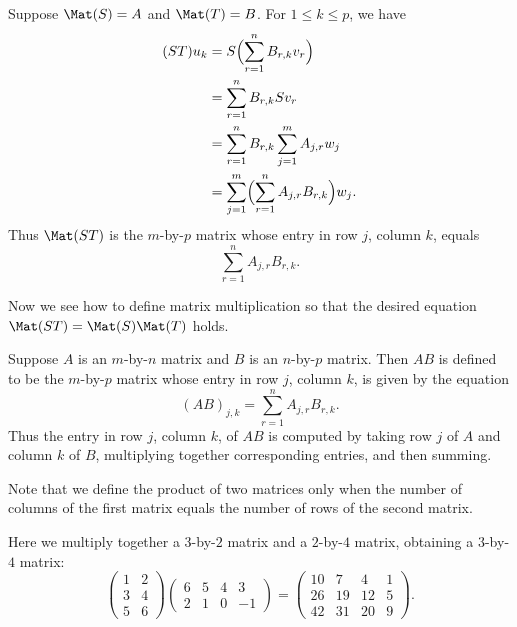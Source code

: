 Suppose $\Mat(S)=A$ and $\Mat(T)=B$. For $1\le k\le p$, we have
\begin{align*}
(ST)u_k &= S\Bigl(\sum_{r=1}^n B_{r,k}v_r\Bigr)\\
        &= \sum_{r=1}^n B_{r,k}Sv_r\\
        &= \sum_{r=1}^n B_{r,k}\sum_{j=1}^m A_{j,r}w_j\\
        &= \sum_{j=1}^m\Bigl(\sum_{r=1}^n A_{j,r}B_{r,k}\Bigr)w_j.
\end{align*}
Thus $\Mat(ST)$ is the $m$-by-$p$ matrix whose entry in row $j$, column $k$,
equals
\[ \sum_{r=1}^n A_{j,r}B_{r,k}. \]

Now we see how to define matrix multiplication so that the desired equation
$\Mat(ST)=\Mat(S)\Mat(T)$ holds.

\begin{definition}\label{ax:3.41}
Suppose $A$ is an $m$-by-$n$ matrix and $B$ is an $n$-by-$p$ matrix. Then $AB$
is defined to be the $m$-by-$p$ matrix whose entry in row $j$, column $k$, is
given by the equation
\[ (AB)_{j,k} = \sum_{r=1}^n A_{j,r}B_{r,k}. \]
Thus the entry in row $j$, column $k$, of $AB$ is computed by taking row $j$ of
$A$ and column $k$ of $B$, multiplying together corresponding entries, and then
summing.
\end{definition}

%
Note that we define the product of two matrices only when the number of columns
of the first matrix equals the number of rows of the second matrix.

\begin{example}\label{ax:3.42}
Here we multiply together a $3$-by-$2$ matrix and a $2$-by-$4$ matrix,
obtaining a $3$-by-$4$ matrix:
\[ \begin{pmatrix} 1 & 2\\ 3 & 4\\ 5 & 6 \end{pmatrix}
   \begin{pmatrix} 6 & 5 & 4 & 3\\ 2 & 1 & 0 & -1 \end{pmatrix}
 = \begin{pmatrix} 10 & 7 & 4 & 1\\ 26 & 19 & 12 & 5\\ 42 & 31 & 20 & 9
   \end{pmatrix}. \]
\end{example}

